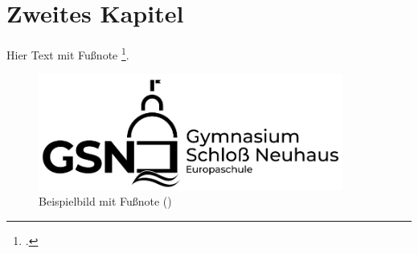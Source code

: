 \section{Zweites Kapitel}
\label{chap:2}

Hier Text mit Fußnote \footcite[465\psqq]{my-unique-book-id}.

\begin{figure}
    \centering
    \includegraphics[width=10cm]{figures/example.png}
    \caption{Beispielbild mit Fußnote (\cite[Vgl.][465]{my-unique-book-id})}
    \label{fig:example}
\end{figure}
